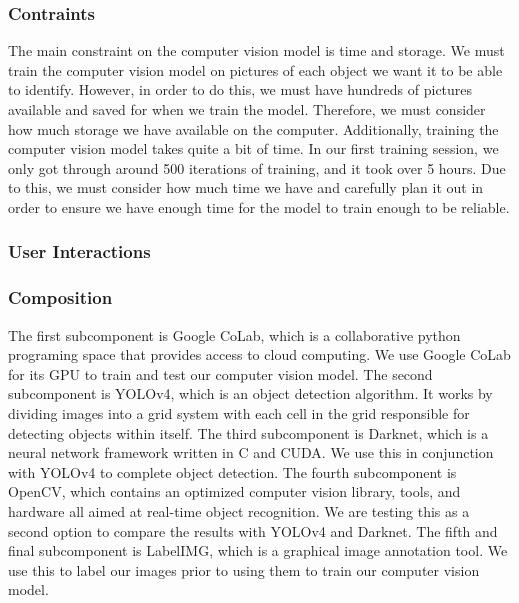 \subsubsection{Contraints}
\label{sec:constraints}

The main constraint on the computer vision model is time and storage. We must
train the computer vision model on pictures of each object we want it to be
able to identify. However, in order to do this, we must have hundreds of
pictures available and saved for when we train the model. Therefore, we must
consider how much storage we have available on the computer. Additionally,
training the computer vision model takes quite a bit of time. In our first
training session, we only got through around 500 iterations of training, and it
took over 5 hours. Due to this, we must consider how much time we have and
carefully plan it out in order to ensure we have enough time for the model to
train enough to be reliable.
\par

\subsubsection{User Interactions}
\label{sec:interactions}

\subsubsection{Composition}
\label{sec:vision_composition}

The first subcomponent is Google CoLab, which is a collaborative python
programing space that provides access to cloud computing. We use Google CoLab
for its GPU to train and test our computer vision model. The second
subcomponent is YOLOv4, which is an object detection algorithm. It works by
dividing images into a grid system with each cell in the grid responsible
for detecting objects within itself. The third subcomponent is Darknet,
which is a neural network framework written in C and CUDA. We use this
in conjunction with YOLOv4 to complete object detection. The fourth
subcomponent is OpenCV, which contains an optimized computer vision
library, tools, and hardware all aimed at real-time object recognition.
We are testing this as a second option to compare the results with
YOLOv4 and Darknet. The fifth and final subcomponent is LabelIMG, which
is a graphical image annotation tool. We use this to label our images
prior to using them to train our computer vision model.
\par


